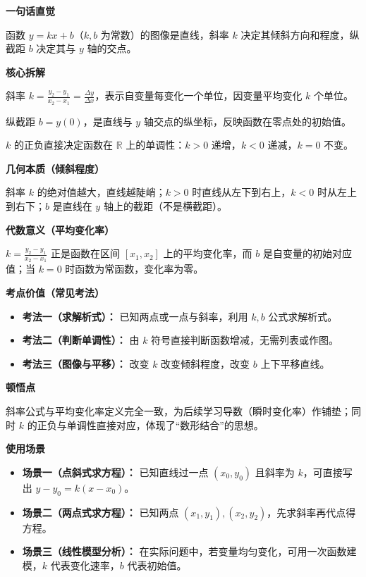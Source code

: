 \begin{explanationbox}
	\textbf{\textcolor{CExplanation}{一句话直觉}}

	函数 $y=kx+b$（$k,b$ 为常数）的图像是直线，斜率 $k$ 决定其倾斜方向和程度，纵截距 $b$ 决定其与 $y$ 轴的交点。

	\medskip
	\textbf{\textcolor{CExplanation}{核心拆解}}
	\begin{description}[style=nextline, leftmargin=2.8em, labelsep=0.5em, itemsep=0.45em]
		\item[\textbf{要点一（斜率公式）：}] 斜率 $k = \frac{y_2 - y_1}{x_2 - x_1} = \frac{\Delta y}{\Delta x}$，表示自变量每变化一个单位，因变量平均变化 $k$ 个单位。
		\item[\textbf{要点二（纵截距）：}] 纵截距 $b = y(0)$，是直线与 $y$ 轴交点的纵坐标，反映函数在零点处的初始值。
		\item[\textbf{要点三（单调性判据）：}] $k$ 的正负直接决定函数在 $\mathbb{R}$ 上的单调性：$k>0$ 递增，$k<0$ 递减，$k=0$ 不变。
	\end{description}

	\medskip
	\textbf{\textcolor{CExplanation}{几何本质（倾斜程度）}}

	斜率 $k$ 的绝对值越大，直线越陡峭；$k>0$ 时直线从左下到右上，$k<0$ 时从左上到右下；$b$ 是直线在 $y$ 轴上的截距（不是横截距）。

	\medskip
	\textbf{\textcolor{CExplanation}{代数意义（平均变化率）}}

	$k = \frac{y_2 - y_1}{x_2 - x_1}$ 正是函数在区间 $[x_1,x_2]$ 上的平均变化率，而 $b$ 是自变量的初始对应值；当 $k=0$ 时函数为常函数，变化率为零。

	\medskip
	\textbf{\textcolor{CExplanation}{考点价值（常见考法）}}
	\begin{itemize}[leftmargin=*, itemsep=0.5em, topsep=0.4em]
		\item \textbf{考法一（求解析式）：} 已知两点或一点与斜率，利用 $k,b$ 公式求解析式。
		\item \textbf{考法二（判断单调性）：} 由 $k$ 符号直接判断函数增减，无需列表或作图。
		\item \textbf{考法三（图像与平移）：} 改变 $k$ 改变倾斜程度，改变 $b$ 上下平移直线。
	\end{itemize}

	\medskip
	\textbf{\textcolor{CExplanation}{顿悟点}}

	斜率公式与平均变化率定义完全一致，为后续学习导数（瞬时变化率）作铺垫；同时 $k$ 的正负与单调性直接对应，体现了“数形结合”的思想。

	\medskip
	\textbf{\textcolor{CExplanation}{使用场景}}
	\begin{itemize}[leftmargin=*, itemsep=0.5em, topsep=0.4em]
		\item \textbf{场景一（点斜式求方程）：} 已知直线过一点 $(x_0,y_0)$ 且斜率为 $k$，可直接写出 $y-y_0 = k(x-x_0)$。
		\item \textbf{场景二（两点式求方程）：} 已知两点 $(x_1,y_1),(x_2,y_2)$，先求斜率再代点得方程。
		\item \textbf{场景三（线性模型分析）：} 在实际问题中，若变量均匀变化，可用一次函数建模，$k$ 代表变化速率，$b$ 代表初始值。
	\end{itemize}
\end{explanationbox}
